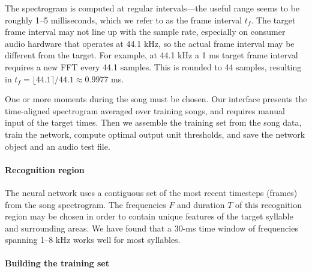 \documentclass[10pt,letterpaper]{article}
\let\oldmarginpar\marginpar
\renewcommand{\marginpar}[1]{\oldmarginpar{\linespread{1}\scriptsize{#1}}}
\renewcommand{\subsubsection}[1]{\paragraph{#1}}
\begin{document}
The spectrogram is computed at regular intervals---the useful range seems to be roughly 1--5
milliseconds, which we refer to as the frame interval
$t_f$.  The target frame interval may not line up with the sample rate, especially on consumer audio hardware that operates at 44.1 kHz, so the actual frame interval may be different from the target.  For example, at 44.1 kHz a 1 ms target frame interval requires a new FFT every 44.1 samples.  This is rounded to 44 samples, resulting in $t_f=\lfloor 44.1 \rceil / 44.1 \approx 0.9977$ ms.

One or more moments during the song must be chosen.  Our interface
presents the time-aligned spectrogram averaged over training songs,
and requires manual input of the target times.  Then we assemble the
training set from the song data, train the network, compute optimal
output unit thresholds, and save the network object and an audio test
file.


\subsubsection{Recognition region}

The neural network uses a contiguous set of the most recent timesteps (frames) from the song
spectrogram.  The frequencies $F$ and duration
$T$ of this recognition region may be chosen in order to contain
unique features of the target syllable and surrounding areas.  We have found that a 30-ms time window of frequencies spanning 1--8 kHz works well for most syllables.




\subsubsection{Building the training set}
\end{document}

